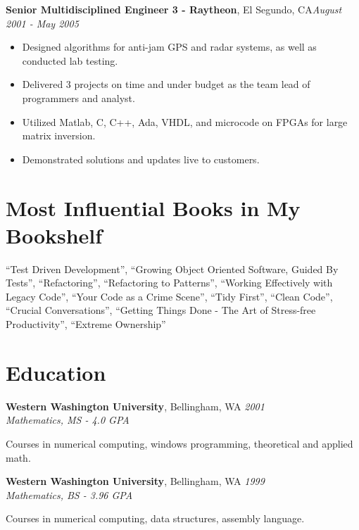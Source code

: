 \documentclass[letter,11pt]{article}
\newenvironment{noindentblock}{%
  \begin{list}{}{%
    \setlength{\leftmargin}{0in} %
    \setlength{\rightmargin}{.25in} %
    \setlength{\topsep}{0pt} %
    \setlength{\parsep}{0pt} %
  }
  \item[]}{\end{list}}
\begin{document}
\pagebreak
\noindent
\textbf{Senior Multidisciplined Engineer 3 - Raytheon}, El Segundo, CA\hfill \textit{August 2001 - May 2005}
\begin{itemize}[leftmargin=*,itemsep=0pt, parsep=0pt,label=$\diamond$]
\item Designed algorithms for anti-jam GPS and radar systems, as well as conducted lab testing.
\item Delivered 3 projects on time and under budget as the team lead of programmers and analyst.
\item Utilized Matlab, C, C++, Ada, VHDL, and microcode on FPGAs for large matrix inversion.
\item Demonstrated solutions and updates live to customers.
\end{itemize}

\section*{Most Influential Books in My  Bookshelf}
``Test Driven Development'', ``Growing Object Oriented Software, Guided By Tests'', ``Refactoring'', ``Refactoring to Patterns'', ``Working Effectively with Legacy Code'', ``Your Code as a Crime Scene'', ``Tidy First'', ``Clean Code'', ``Crucial Conversations'', ``Getting Things Done - The Art of Stress-free Productivity'', ``Extreme Ownership''

\section*{Education}

\noindent
\textbf{Western Washington University}, Bellingham, WA \hfill \textit{2001}\\
\textit{Mathematics, MS - 4.0 GPA} 
\begin{noindentblock}
Courses in numerical computing, windows programming, theoretical and applied math.
\end{noindentblock}

\noindent
\textbf{Western Washington University}, Bellingham, WA \hfill \textit{1999}\\
\textit{Mathematics, BS - 3.96 GPA}
\begin{noindentblock}
Courses in numerical computing, data structures, assembly language.
\end{noindentblock}

\end{document}
